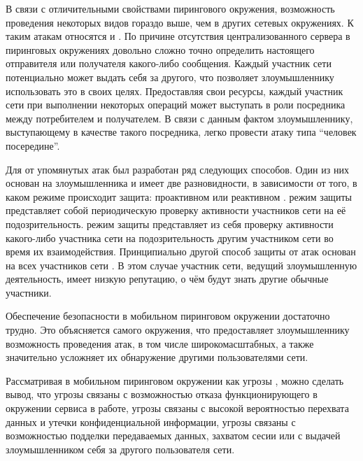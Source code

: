 %
В связи с отличительными свойствами пирингового окружения, возможность проведения некоторых видов  гораздо выше, чем в других сетевых окружениях. 
%
К таким атакам относятся  и  . 
%
По причине отсутствия централизованного сервера в пиринговых окружениях довольно сложно точно определить настоящего отправителя или получателя какого-либо сообщения.
%
Каждый участник сети потенциально может выдать себя за другого, что позволяет злоумышленнику использовать это в своих целях.  
%
Предоставляя свои ресурсы, каждый участник сети при выполнении некоторых операций может выступать в роли посредника между потребителем и получателем.
%
В связи с данным фактом злоумышленнику, выступающему в качестве такого посредника, легко провести атаку типа ``человек посередине''. 

%
Для  от упомянутых атак был разработан ряд следующих способов. 
%
Один из них основан на  злоумышленника и имеет две разновидности, в зависимости от того, в каком режиме происходит защита: проактивном или реактивном . 
%
 режим защиты представляет собой периодическую проверку активности участников сети на её подозрительность. 
%
 режим защиты представляет из себя проверку активности какого-либо участника сети на подозрительность другим участником сети во время их взаимодействия. 
%
Принципиально другой способ защиты от атак основан на  всех участников сети  .
%
В этом случае участник сети, ведущий злоумышленную деятельность, имеет низкую репутацию, о чём будут знать другие обычные участники. 



%
Обеспечение безопасности в мобильном пиринговом окружении достаточно трудно. 
%
Это объясняется  самого окружения, что предоставляет злоумышленнику возможность проведения атак, в том числе широкомасштабных, а также значительно усложняет их обнаружение другими пользователями сети.

%
Рассматривая  в мобильном пиринговом окружении как угрозы , можно сделать вывод, что угрозы  связаны с возможностью отказа функционирующего в окружении сервиса в работе, угрозы  связаны с высокой вероятностью перехвата данных и утечки конфиденциальной информации, угрозы  связаны с возможностью подделки передаваемых данных, захватом сесии или с выдачей злоумышленником себя за другого пользователя сети. 

